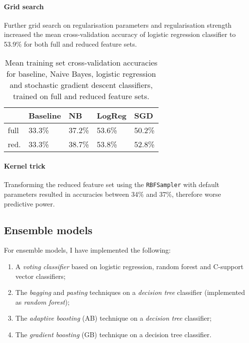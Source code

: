\documentclass[10pt, twocolumn]{article}
\begin{document}
\paragraph{Grid search} Further grid search on regularisation parameters and regularisation strength increased the mean cross-validation accuracy of logistic regression classifier to 53.9\% for both full and reduced feature sets.

\begin{table}[]
	\begin{tabularx}{\linewidth}{XXXXX}
		\hline
								 & \textbf{Baseline} & \textbf{NB} & \textbf{LogReg} & \textbf{SGD} \\ \hline
		full   & 33.3\%            & 37.2\%      & 53.6\%          & 50.2\%       \\
		red. & 33.3\%            & 38.7\%      & 53.8\%          & 52.8\%       \\ \hline
		\end{tabularx}
\caption{Mean training set cross-validation accuracies for baseline, Naive Bayes, logistic regression and stochastic gradient descent classifiers, trained on full and reduced feature sets.}\label{multiclass}
\end{table}

\paragraph{Kernel trick} Transforming the reduced feature set using the \texttt{RBFSampler} with default parameters resulted in accuracies between 34\% and 37\%, therefore worse predictive power.

\subsection{Ensemble models}
For ensemble models, I have implemented the following: 
\begin{enumerate}[label=(\textit{\roman*})]
	\item A \textit{voting classifier} based on logistic regression, random forest and C-support vector classifiers;
	\item The \textit{bagging} and \textit{pasting} techniques on a \textit{decision tree} classifier (implemented as \textit{random forest});
	\item The \textit{adaptive boosting} (AB) technique on a \textit{decision tree} classifier;
	\item The \textit{gradient boosting} (GB) technique on a decision tree classifier.
\end{enumerate}
\end{document}

